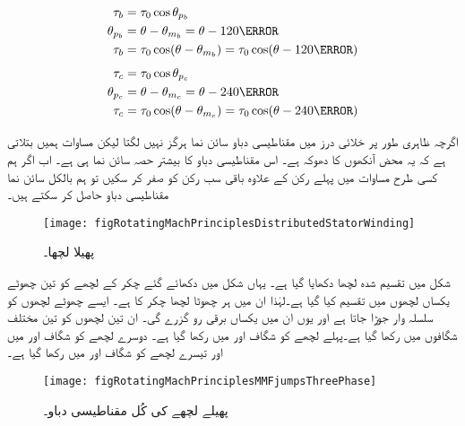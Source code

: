 \begin{gather}
\begin{aligned}\label{مساوات_گھومتے_مشین_ب_موج}
\tau_b&=\tau_0 \cos \theta_{p_b}\\
\theta_{p_b}&=\theta-\theta_{m_b}=\theta-120\degree\\
\tau_b&=\tau_0 \cos (\theta-\theta_{m_b})=\tau_0 \cos (\theta-120\degree)
\end{aligned}
\end{gather}
%
\begin{gather}
\begin{aligned}\label{مساوات_گھومتے_مشین_پ_موج}
\tau_c&=\tau_0 \cos \theta_{p_c}\\
\theta_{p_c}&=\theta-\theta_{m_c}=\theta-240\degree\\
\tau_c&=\tau_0 \cos (\theta-\theta_{m_c})=\tau_0 \cos (\theta-240\degree)
\end{aligned}
\end{gather}

اگرچہ ظاہری طور پر خلائی درز میں مقناطیسی دباو سائن نما ہرگز نہیں لگتا لیکن مساوات   ہمیں بتلاتی ہے کہ یہ محض آنکھوں کا دھوکہ ہے۔ اس مقناطیسی دباو کا بیشتر حصہ سائن نما ہی ہے۔  اب اگر ہم کسی طرح مساوات    میں پہلے رکن کے علاوہ باقی سب رکن کو صفر کر سکیں تو ہم بالکل  سائن نما مقناطیسی دباو حاصل کر سکتے ہیں۔
\begin{figure}
\centering
\texttt{[image: figRotatingMachPrinciplesDistributedStatorWinding]}
\caption{پھیلا لچھا۔}
\label{شکل_گھومتے_مشین_پھیلا_لچھا}
\end{figure}

شکل   میں تقسیم شدہ لچھا دکھایا گیا ہے۔ یہاں شکل   میں دکھائے گئے  چکر کے لچھے کو تین چھوٹے یکساں لچھوں میں تقسیم کیا گیا ہے۔لہٰذا ان میں ہر چھوٹا لچھا  چکر کا ہے۔  ایسے چھوٹے لچھوں کو سلسلہ وار جوڑا جاتا ہے اور  یوں ان میں یکساں  برقی رو  گزرے گی۔ ان تین لچھوں کو تین مختلف شگافوں میں رکھا گیا ہے۔پہلے لچھے کو شگاف  اور  میں رکھا گیا ہے۔ دوسرے لچھے کو شگاف  اور  میں اور تیسرے لچھے کو شگاف  اور  میں رکھا گیا ہے۔
\begin{figure}
\centering
\texttt{[image: figRotatingMachPrinciplesMMFjumpsThreePhase]}
\caption{پھیلے لچھے کی کُل مقناطیسی دباو۔}
\label{شکل_گھومتے_مشین_پھیلے_لچھے_کی_دباو}
\end{figure}



